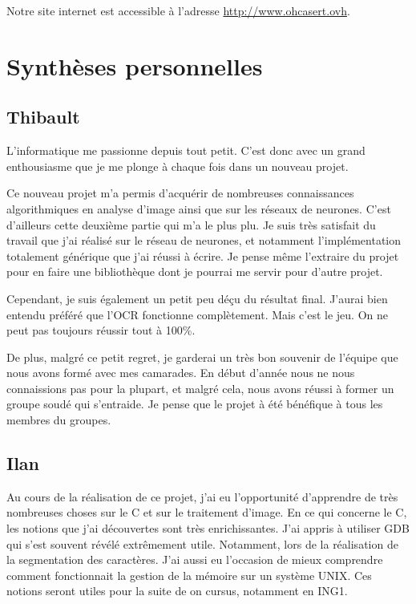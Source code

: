 \documentclass[11pt]{report}
\begin{document}
Notre site internet est accessible à l'adresse \url{http://www.ohcasert.ovh}.

\chapter{Synthèses personnelles}

\section{Thibault}

L'informatique me passionne depuis tout petit. C'est donc avec un grand enthousiasme que je me plonge à chaque fois dans un nouveau projet.

Ce nouveau projet m'a permis d'acquérir de nombreuses connaissances algorithmiques en analyse d'image ainsi que sur les réseaux de neurones. C'est d'ailleurs cette deuxième partie qui m'a le plus plu. Je suis très satisfait du travail que j'ai réalisé sur le réseau de neurones, et notamment l'implémentation totalement générique que j'ai réussi à écrire. Je pense même l'extraire du projet pour en faire une bibliothèque dont je pourrai me servir pour d'autre projet.

Cependant, je suis également un petit peu déçu du résultat final. J'aurai bien entendu préféré que l'OCR fonctionne complètement. Mais c'est le jeu. On ne peut pas toujours réussir tout à 100\%.

De plus, malgré ce petit regret, je garderai un très bon souvenir de l'équipe que nous avons formé avec mes camarades. En début d'année nous ne nous connaissions pas pour la plupart, et malgré cela, nous avons réussi à former un groupe soudé qui s'entraide. Je pense que le projet à été bénéfique à tous les membres du groupes.

\section{Ilan}

Au cours de la réalisation de ce projet, j'ai eu l’opportunité d'apprendre de très nombreuses choses sur le C et sur le traitement d'image. En ce qui concerne le C, les notions que j'ai découvertes sont très enrichissantes. J'ai appris à utiliser GDB qui s'est souvent révélé extrêmement utile. Notamment, lors de la réalisation de la segmentation des caractères. J'ai aussi eu l'occasion de mieux comprendre comment fonctionnait la gestion de la mémoire sur un système UNIX. Ces notions seront utiles pour la suite de on cursus, notamment en ING1.
\end{document}
